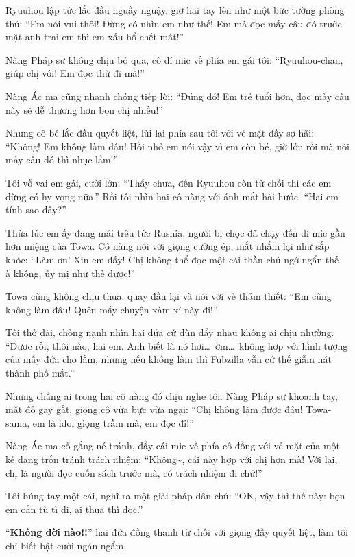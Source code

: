 \documentclass[../main.tex]{subfiles}
\begin{document}
Ryuuhou lập tức lắc đầu nguầy nguậy, giơ hai tay lên như một bức tường phòng thủ: ``Em nói vui thôi! Đừng có nhìn em như thế! Em mà đọc mấy câu đó trước mặt anh trai em thì em xấu hổ chết mất!''

Nàng Pháp sư không chịu bỏ qua, cô dí mic về phía em gái tôi: ``Ryuuhou-chan, giúp chị với! Em đọc thử đi mà!''

Nàng Ác ma cũng nhanh chóng tiếp lời: ``Đúng đó! Em trẻ tuổi hơn, đọc mấy câu này sẽ dễ thương hơn bọn chị nhiều!''

Nhưng cô bé lắc đầu quyết liệt, lùi lại phía sau tôi với vẻ mặt đầy sợ hãi: ``Không! Em không làm đâu! Hồi nhỏ em nói vậy vì em còn bé, giờ lớn rồi mà nói mấy câu đó thì nhục lắm!''

Tôi vỗ vai em gái, cười lớn: ``Thấy chưa, đến Ryuuhou còn từ chối thì các em đừng có hy vọng nữa.'' Rồi tôi nhìn hai cô nàng với ánh mắt hài hước. ``Hai em tính sao đây?''

Thừa lúc em ấy đang mải trêu tức Rushia, người bị chọc đã chạy đến dí mic gần hơn miệng của Towa. Cô nàng nói với giọng cưỡng ép, mắt nhắm lại như sắp khóc: ``Làm ơn! Xin em đấy! Chị không thể đọc một cái thần chú ngớ ngẩn thế-- à không, ủy mị như thế được!''

Towa cũng không chịu thua, quay đầu lại và nói với vẻ thảm thiết: ``Em cũng không làm đâu! Quên mấy chuyện xàm xí này đi!''

Tôi thở dài, chống nạnh nhìn hai đứa cứ đùn đẩy nhau không ai chịu nhường. ``Được rồi, thôi nào, hai em. Anh biết là nó hơi\dots\ ờm\dots\ không hợp với hình tượng của mấy đứa cho lắm, nhưng nếu không làm thì Fubzilla vẫn cứ thế giẫm nát thành phố mất.''

Nhưng chẳng ai trong hai cô nàng đó chịu nghe tôi. Nàng Pháp sư khoanh tay, mặt đỏ gay gắt, giọng cô vừa bực vừa ngại: ``Chị không làm được đâu! Towa-sama, em là idol giọng trầm mà, em đọc đi!''

Nàng Ác ma cố gắng né tránh, đẩy cái mic về phía cô đồng với vẻ mặt của một kẻ đang trốn tránh trách nhiệm: ``Không\~{}, cái này hợp với chị hơn mà! Với lại, chị là người đọc cuốn sách trước mà, có trách nhiệm đi chứ!''

Tôi búng tay một cái, nghĩ ra một giải pháp dân chủ: ``OK, vậy thì thế này: bọn em oẳn tù tì đi, ai thua thì đọc.''

``\textbf{Không đời nào!!}'' hai đứa đồng thanh từ chối với giọng đầy quyết liệt, làm tôi chỉ biết bật cười ngán ngẩm.

\end{document}
